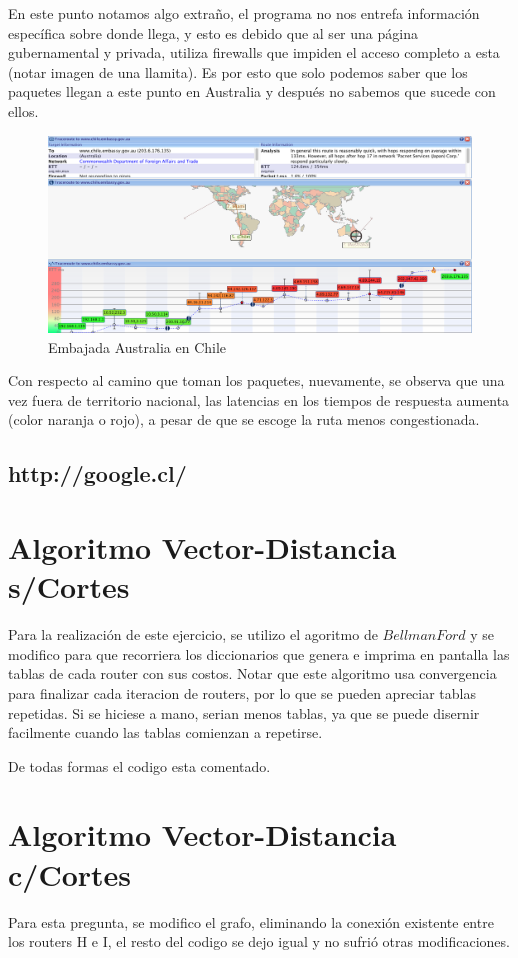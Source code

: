\documentclass[a4papaer]{article}
\begin{document}
En este punto notamos algo extraño, el programa no nos entrefa información específica sobre donde llega, y esto es debido que al ser una página gubernamental y privada, utiliza firewalls que impiden el acceso completo a esta (notar imagen de una llamita). Es por esto que solo podemos saber que los paquetes llegan a este punto en Australia y después no sabemos que sucede con ellos.

\pagebreak

\begin{figure}[h]
  \centering
    \includegraphics[width=1\textwidth]{au2}
  \caption{Embajada Australia en Chile}
  \label{fig:Trace Route de http://www.chile.embassy.gov.au/}
\end{figure}

Con respecto al camino que toman los paquetes, nuevamente, se observa que una vez fuera de territorio nacional, las latencias en los tiempos de respuesta aumenta (color naranja o rojo), a pesar de que se escoge la ruta menos congestionada.

\pagebreak

\subsection{http://google.cl/}

\pagebreak

\section{Algoritmo Vector-Distancia s/Cortes}
 
Para la realización de este ejercicio, se utilizo el agoritmo de $Bellman Ford$ y se modifico para que recorriera los diccionarios que genera e imprima en pantalla las tablas de cada router con sus costos. Notar que este algoritmo usa convergencia para finalizar cada iteracion de routers, por lo que se pueden apreciar tablas repetidas. Si se hiciese a mano, serian menos tablas, ya que se puede disernir facilmente cuando las tablas comienzan a repetirse.

De todas formas el codigo esta comentado.

\section{Algoritmo Vector-Distancia c/Cortes}

Para esta pregunta, se modifico el grafo, eliminando la conexión existente entre los routers H e I, el resto del codigo se dejo igual y no sufrió otras modificaciones.
\end{document}
